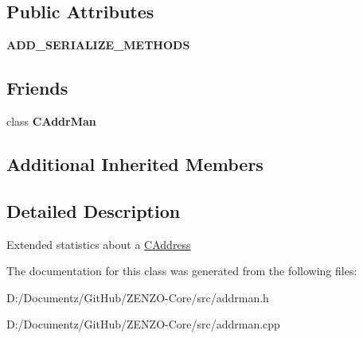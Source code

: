\subsection*{Public Attributes}
\begin{DoxyCompactItemize}
\item 
\mbox{\label{class_c_addr_info_a9d5e0b95fa494171e4bffb900094fe2e}} 
{\bfseries A\+D\+D\+\_\+\+S\+E\+R\+I\+A\+L\+I\+Z\+E\+\_\+\+M\+E\+T\+H\+O\+DS}
\end{DoxyCompactItemize}
\subsection*{Friends}
\begin{DoxyCompactItemize}
\item 
\mbox{\label{class_c_addr_info_a17ec4e9e560da58786d2ca36092bf83d}} 
class {\bfseries C\+Addr\+Man}
\end{DoxyCompactItemize}
\subsection*{Additional Inherited Members}


\subsection{Detailed Description}
Extended statistics about a \mbox{\hyperlink{class_c_address}{C\+Address}} 

The documentation for this class was generated from the following files\+:\begin{DoxyCompactItemize}
\item 
D\+:/\+Documentz/\+Git\+Hub/\+Z\+E\+N\+Z\+O-\/\+Core/src/addrman.\+h\item 
D\+:/\+Documentz/\+Git\+Hub/\+Z\+E\+N\+Z\+O-\/\+Core/src/addrman.\+cpp\end{DoxyCompactItemize}
